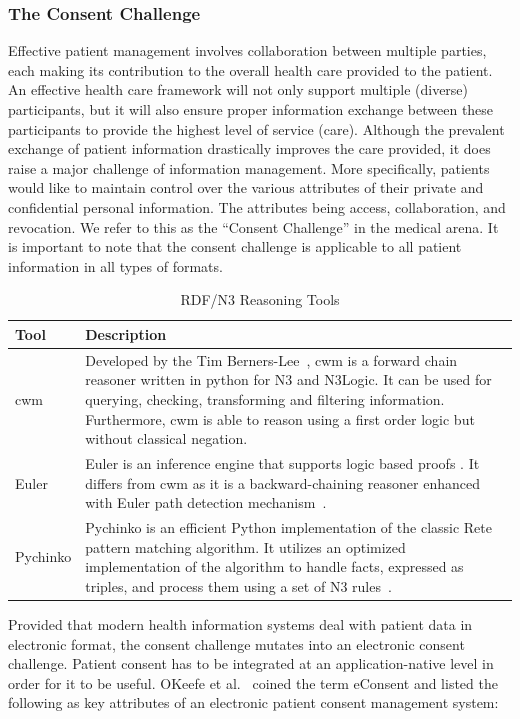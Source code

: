 \documentclass[conference]{IEEEtran}
\begin{document}
\subsubsection*{The Consent Challenge}
\label{diff}
Effective patient management involves collaboration between multiple parties, each making its contribution to the overall health care provided to the patient. 
An effective health care framework will not only support multiple (diverse) participants, but it will also ensure proper information exchange between these
participants to provide the highest level of service (care).  Although the prevalent exchange of patient information drastically improves the care provided, it
does raise a major challenge of information management.  More specifically, patients would like to maintain control over the various attributes of their private
and confidential personal information.  The attributes being access, collaboration, and revocation.  We refer to this as the ``Consent Challenge'' in the medical
arena.  It is important to note that the consent challenge is applicable to all patient information in all types of formats.  

\begin{table}[!t]
\centering
 \begin{tabular}{m{1cm}|m{9cm}}
\textbf{Tool} & \textbf{Description}\\
\hline\hline
cwm & Developed by the Tim Berners-Lee~\cite{berners-lee2008}, cwm is a forward chain reasoner written in python for N3 and N3Logic.  It can be used for
querying, checking, transforming and filtering information.  Furthermore, cwm is able to reason using a first order logic but without classical negation.\\
\hline
Euler & Euler is an inference engine that supports logic based proofs .  It differs from cwm as it is a backward-chaining reasoner enhanced with Euler path
detection mechanism~\cite{naudts2003inference}.\\
\hline
Pychinko & Pychinko is an efficient Python implementation of the classic Rete pattern matching algorithm.  It utilizes an optimized implementation of the
algorithm to handle facts, expressed as triples, and process them using a set of N3 rules~\cite{berners-lee2008}.\\
 \end{tabular}
\caption{RDF/N3 Reasoning Tools}
\label{tab:tools}
\end{table}

Provided that modern health information systems deal with patient data in electronic format, the consent challenge mutates into an electronic consent
challenge.  Patient consent has to be integrated at an application-native level in order for it to be useful. OKeefe et al.~\cite{okeefe2002implementation}
coined the term eConsent and listed the following as key attributes of an electronic patient consent management system:
\end{document}

